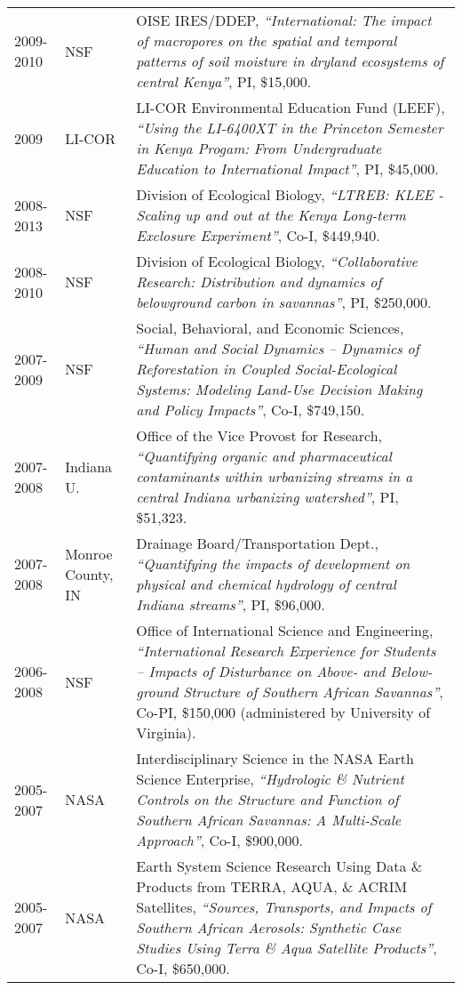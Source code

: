 \documentclass[10pt]{report}
\begin{document}
\begin{longtable}{ l p{.8in} p{5in}  }
2009-2010 & NSF & OISE IRES/DDEP, \emph{``International: The impact of macropores on the spatial and temporal patterns of soil moisture in dryland ecosystems of central Kenya''}, PI, \$15,000. \\

2009 & LI-COR & LI-COR Environmental Education Fund (LEEF), \emph{``Using the LI-6400XT in the Princeton Semester in Kenya Progam: From Undergraduate Education to International Impact''}, PI, \$45,000. \\

2008-2013 & NSF & Division of Ecological Biology, \emph{``LTREB: KLEE - Scaling up and out at the Kenya Long-term Exclosure Experiment''}, Co-I, \$449,940. \\ 

2008-2010 & NSF & Division of Ecological Biology, \emph{``Collaborative Research: Distribution and dynamics of belowground carbon in savannas''}, PI, \$250,000. \\ 

2007-2009 & NSF  & Social, Behavioral, and Economic Sciences, \emph{``Human and Social Dynamics -- Dynamics of Reforestation in Coupled Social-Ecological Systems: Modeling Land-Use Decision Making and Policy Impacts''}, Co-I, \$749,150. \\

2007-2008 & Indiana U.  & Office of the Vice Provost for Research, \emph{``Quantifying organic and pharmaceutical contaminants within urbanizing streams in a central Indiana urbanizing watershed''}, PI, \$51,323. \\

2007-2008  & Monroe County, IN & Drainage Board/Transportation Dept., \emph{``Quantifying the impacts of development on physical and chemical hydrology of central Indiana streams''}, PI, \$96,000. \\

2006-2008 & NSF &  Office of International Science and Engineering, \emph{``International Research Experience for Students -- Impacts of Disturbance on Above- and Below-ground Structure of Southern African Savannas''}, Co-PI, \$150,000 (administered by University of Virginia). \\

2005-2007 &  NASA & Interdisciplinary Science in the NASA Earth Science Enterprise,\emph{ ``Hydrologic \& Nutrient Controls on the Structure and Function of Southern African Savannas: A Multi-Scale Approach''}, Co-I, \$900,000. \\ 

2005-2007 & NASA &  Earth System Science Research Using Data \& Products from TERRA, AQUA, \& ACRIM Satellites, \emph{``Sources, Transports, and Impacts of Southern African Aerosols: Synthetic Case Studies Using Terra \& Aqua Satellite Products''}, Co-I, \$650,000. \\

\end{longtable}
\end{document}
